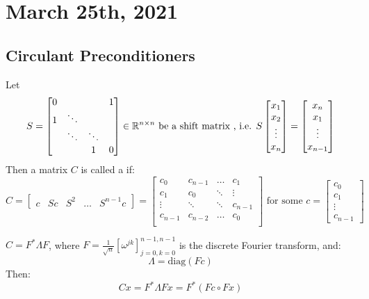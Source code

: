 \documentclass[../main/main.tex]{subfiles}
\begin{document}
\section{March 25th, 2021}
\subsection{Circulant Preconditioners}
\begin{definition}Let \[
S = \begin{bmatrix}
  0&&&1\\
  1&\ddots&&\\
  &\ddots&\ddots&\\
  &&1&0\\
\end{bmatrix}
\in \mathbb{R} ^{n\times n} \text{ be a shift matrix , i.e. }S \begin{bmatrix}
x_1\\x_{2}\\ \vdots  \\ x_{n}
\end{bmatrix}  = \begin{bmatrix}
x_{n}\\ x_{1}\\ \vdots \\ x_{n-1}
\end{bmatrix}
  \]
  Then a matrix $C$ is called a  if: \[
C = \begin{bmatrix}
c&Sc&S^2& \ldots & S^{n-1}c
\end{bmatrix} =
 \begin{bmatrix}
  c_{0}&c_{n-1}&\ldots &c_{1}\\
  c_{1}&c_{0}&\ddots&\vdots\\
  \vdots&\ddots&\ddots&c_{n-1}\\
  c_{n-1}&c_{n-2}&\ldots &c_{0}\\
\end{bmatrix}
\text{ for some }c = \begin{bmatrix}
c_{0}\\c_{1}\\ \vdots\\c_{n-1}
\end{bmatrix}
  \]

\end{definition}
\begin{theorem}
  $C = F^{*}\Lambda F$, where $F = \frac{1}{\sqrt{n}}[\omega^{j k}]_{j=0, k=0}^{n-1, n-1}$ is the discrete Fourier transform, and: \[
    \Lambda = \text{diag}(Fc)\] Then:
   \[ Cx = F^{*} \Lambda F x = F^{*}(Fc \circ Fx) \]
\end{theorem}
\end{document}
